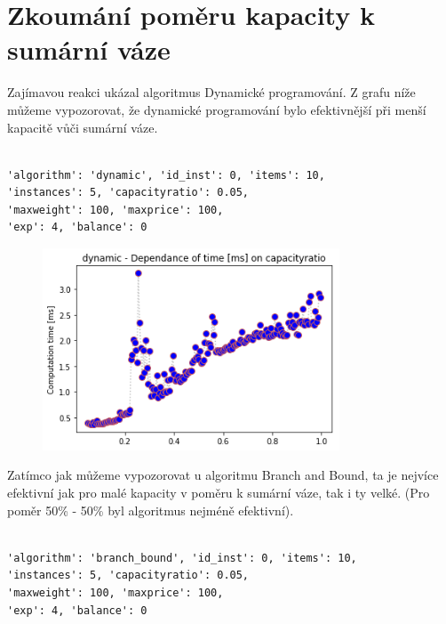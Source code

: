 \documentclass[a4paper,10pt,twocolumn]{article}
\begin{document}

\section{Zkoumání poměru kapacity k sumární váze}


Zajímavou reakci ukázal algoritmus Dynamické programování. Z grafu níže můžeme vypozorovat, že dynamické programování bylo efektivnější při menší kapacitě vůči sumární váze.

   \begin{verbatim}

'algorithm': 'dynamic', 'id_inst': 0, 'items': 10,
'instances': 5, 'capacityratio': 0.05,
'maxweight': 100, 'maxprice': 100, 
'exp': 4, 'balance': 0
                                   \end{verbatim}

\begin{figure}[H]
  \begin{center}
    \includegraphics[height=6cm]{graphs/time_on_capacityratio_dynamic.png}
  \end{center}
\end{figure}

Zatímco jak můžeme vypozorovat u algoritmu Branch and Bound, ta je nejvíce efektivní jak pro malé kapacity v poměru k sumární váze, tak i ty velké. (Pro poměr 50\% - 50\% byl algoritmus nejméně efektivní).

   \begin{verbatim}

'algorithm': 'branch_bound', 'id_inst': 0, 'items': 10,
'instances': 5, 'capacityratio': 0.05,
'maxweight': 100, 'maxprice': 100, 
'exp': 4, 'balance': 0
                                   \end{verbatim}
\end{document}
